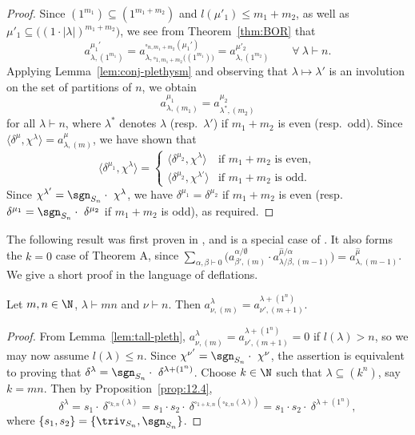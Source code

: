 \begin{proof}
	Since $(1^{m_1})\subseteq(1^{m_1+m_2})$ and $l(\mu'_1)\le m_1+m_2$, as well as $\mu'_1\subseteq \big((1\cdot|\lambda|)^{m_1+m_2}\big)$, we see from Theorem~\ref{thm:BOR} that
	\[ a^{\mu_1'}_{\lambda,(1^{m_1})} = a^{\square_{n,m_1+m_2}(\mu_1')}_{\lambda,\square_{1,m_1+m_2}\big((1^{m_1})\big)} = a^{\mu'_2}_{\lambda,(1^{m_2})}\qquad\forall\ \lambda\vdash n. \]
	Applying Lemma~\ref{lem:conj-plethysm} and observing that $\lambda\mapsto\lambda'$ is an involution on the set of partitions of $n$, we obtain
	\[ a^{\mu_1}_{\lambda,(m_1)} = a^{\mu_2}_{\lambda^\ast,(m_2)} \]
	for all $\lambda\vdash n$, where $\lambda^\ast$ denotes $\lambda$ (resp.~$\lambda'$) if $m_1+m_2$ is even (resp.~odd). 
	Since $\langle \delta^\mu, \chi^\lambda\rangle = a^\mu_{\lambda,(m)}$, we have shown that
	\[ \langle \delta^{\mu_1},\chi^\lambda\rangle = \begin{cases}
		\langle \delta^{\mu_2},\chi^\lambda\rangle & \text{if $m_1+m_2$ is even},\\ \langle \delta^{\mu_2}, \chi^{\lambda'}\rangle & \text{if $m_1+m_2$ is odd}.\end{cases} \]
	Since $\chi^{\lambda'}=\sgn_{S_n}\cdot\ \chi^\lambda$, we have $\delta^{\mu_1}=\delta^{\mu_2}$ if $m_1+m_2$ is even (resp.~$\delta^{\mu_1}=\sgn_{S_n}\cdot\ \delta^{\mu_2}$ if $m_1+m_2$ is odd), as required.
\end{proof}

The following result was first proven in \cite[Proposition 1.16]{BCV}, and is a special case of \cite[Theorem 1.1]{dBPW}. It also forms the $k=0$ case of Theorem A, since $\sum_{\alpha,\beta\vdash 0} \big(a^{\alpha/\emptyset}_{\beta',(m)}\cdot a^{\hat{\mu}/\alpha}_{\lambda/\beta,(m-1)}\big) = a^{\hat{\mu}}_{\lambda,(m-1)}$. We give a short proof in the language of deflations.

\begin{theorem}\label{thm:4.4.3}
	Let $m,n\in\N$, $\lambda\vdash mn$ and $\nu\vdash n$. Then $a^\lambda_{\nu,(m)} = a^{\lambda+(1^n)}_{\nu',(m+1)}$.
\end{theorem}

\begin{proof}
	From Lemma~\ref{lem:tall-pleth}, $a^\lambda_{\nu,(m)} = a^{\lambda+(1^n)}_{\nu',(m+1)}=0$ if $l(\lambda)>n$, so we may now assume $l(\lambda)\le n$. 
	Since $\chi^{\nu'}=\sgn_{S_n}\cdot\ \chi^\nu$, the assertion is equivalent to proving that $\delta^\lambda=\sgn_{S_n}\cdot\ \delta^{\lambda+(1^n)}$. 
	Choose $k\in\N$ such that $\lambda\subseteq(k^n)$, say $k=mn$. Then by Proposition~\ref{prop:12.4},
	\[ \delta^\lambda =s_1\cdot \ \delta^{\square_{k,n}(\lambda)} = s_1\cdot s_2\cdot\ \delta^{\square_{1+k,n}(\square_{k,n}(\lambda))} = s_1\cdot s_2\cdot\ \delta^{\lambda+(1^n)}, \]
	where $\{s_1,s_2\}=\{\triv_{S_n},\sgn_{S_n}\}$.
\end{proof}
